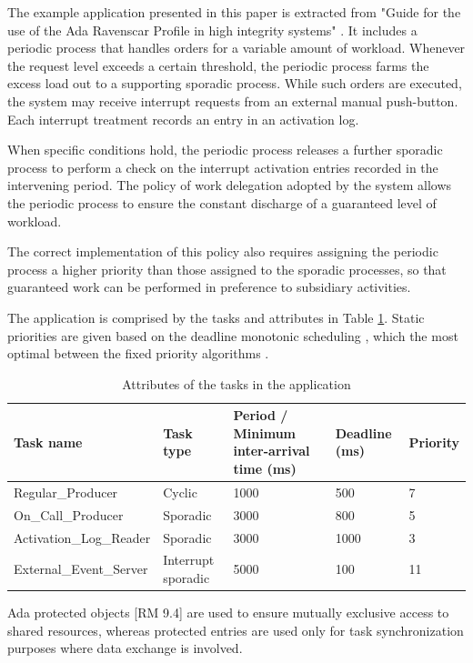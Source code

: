\documentclass{article}
\begin{document}
The example application presented in this paper is extracted from "Guide for the use of the
Ada Ravenscar Profile in
high integrity systems" \cite{ycs}. It includes a periodic process that handles orders for a variable amount of workload. Whenever the request level exceeds a certain threshold, the periodic process farms the excess load out to a supporting sporadic process. While such orders are executed, the system may receive interrupt requests from an external manual push-button. Each interrupt treatment records an entry in an activation log.

When specific conditions hold, the periodic process releases a further sporadic process to perform a check on the interrupt activation entries recorded in the intervening period. The policy of work delegation adopted by the system allows the periodic process to ensure the constant discharge of a guaranteed level of workload.

The correct implementation of this policy also requires assigning the periodic process a higher priority than those assigned to the sporadic processes, so that guaranteed work can be performed in preference to subsidiary activities.

The application is comprised by the tasks and attributes in Table \ref{tab:tasks-attributes}. Static priorities are given based on the deadline monotonic scheduling \cite{rm-dm}, which the most optimal between the fixed priority algorithms \cite{optimality-rm-dm}.

\begin{table}[!htbp]
   \centering
   \begin{tabular}{lllll}
     \toprule
     Task name & Task type & Period / Minimum inter-arrival time (ms) & Deadline (ms) & Priority  \\
     \midrule
     Regular\_Producer & Cyclic & 1000 & 500 & 7 \\
     On\_Call\_Producer & Sporadic & 3000 & 800 & 5 \\
     Activation\_Log\_Reader & Sporadic & 3000 & 1000 & 3 \\
     External\_Event\_Server & Interrupt sporadic & 5000 & 100 & 11 \\
     \bottomrule
   \end{tabular}
   \caption{Attributes of the tasks in the application \cite{ycs}}
   \label{tab:tasks-attributes}
\end{table}

Ada protected objects [RM 9.4] are used to ensure mutually exclusive access to shared resources, whereas protected entries are used only for task synchronization purposes where data exchange is involved.
\end{document}
